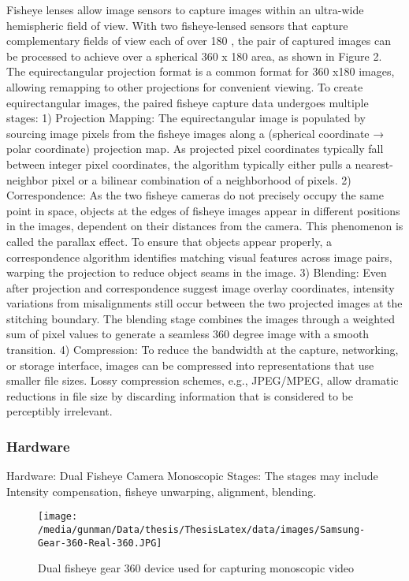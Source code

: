 Fisheye lenses allow image sensors to capture images within an ultra-wide hemispheric field of view. With two fisheye-lensed sensors that capture complementary fields of view each of over 180 \textdegree  , the pair of captured images can be processed to achieve over a spherical 360 \textdegree  x 180 \textdegree   area, as shown in Figure 2. The equirectangular projection format is a common format for 360 \textdegree  x180 \textdegree   images, allowing remapping to other projections for convenient viewing. To create equirectangular images, the paired fisheye capture data undergoes multiple stages:
1) Projection Mapping: The equirectangular image is populated by sourcing image pixels from the fisheye images along a (spherical coordinate → polar coordinate) projection map. As projected pixel coordinates typically fall between integer pixel coordinates, the algorithm typically either pulls a nearest-neighbor pixel or a bilinear combination of a neighborhood of pixels. 
2) Correspondence:  As the two fisheye cameras do not precisely occupy the same point in space, objects at the edges of fisheye images appear in different positions in the images, dependent on their distances from the camera. This phenomenon is called the parallax effect. To ensure that objects appear properly, a correspondence algorithm identifies matching visual features across image pairs, warping the projection to reduce object seams in the image.
3) Blending: Even after projection and correspondence suggest image overlay coordinates, intensity variations from misalignments still occur between the two projected images at the stitching boundary. The blending stage combines the images through a weighted sum of pixel values to generate a seamless 360 \text degree   image with a smooth transition.	
4) Compression: To reduce the bandwidth at the capture, networking, or storage interface, images can be compressed into representations that use smaller file sizes. Lossy compression schemes, e.g., JPEG/MPEG, allow dramatic reductions in file size by discarding information that is considered to be perceptibly irrelevant.
\subsubsection{Hardware}
Hardware: Dual Fisheye Camera \newline
Monoscopic Stages:
The stages may include Intensity compensation, fisheye unwarping, alignment, blending. 
\begin{figure}[h]
	\begin{center}
		\texttt{[image: /media/gunman/Data/thesis/ThesisLatex/data/images/Samsung-Gear-360-Real-360.JPG]}
		\caption{Dual fisheye gear 360 device used for capturing monoscopic video}
		\label{ODS_Input_Output}
	\end{center}
	\vspace{-0.3in}
\end{figure} 





